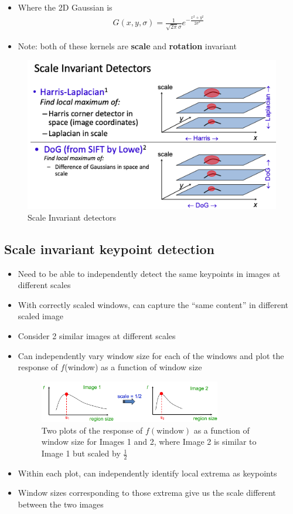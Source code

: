 \documentclass[letterpaper,12pt]{article}
\begin{document}
\begin{itemize}
 \item Where the 2D Gaussian is
       \begin{align}
        G(x, y, \sigma) = \frac{1}{\sqrt{2\pi}\sigma}e^{-\frac{x^2 + y^2}{2\sigma^2}}
       \end{align}
 \item Note: both of these kernels are \textbf{scale} and \textbf{rotation} invariant
\end{itemize}

\begin{figure}
 \includegraphics[scale=0.75]{images/scale_invariant_detectors.png}
 \caption{Scale Invariant detectors}
\end{figure}

\subsection{Scale invariant keypoint detection}
\begin{itemize}
 \item Need to be able to independently detect the same keypoints in images at different scales
 \item With correctly scaled windows, can capture the ``same content'' in different scaled image
 \item Consider 2 similar images at different scales
 \item Can independently vary window size for each of the windows and plot the response of $f$(window) as a function of window size
       \begin{figure}[h]
        \centering
        \includegraphics[width=0.75\textwidth]{images/max.png}
        \caption{Two plots of the response of $f(\text{window})$ as a function of window size for Images 1 and 2, where Image 2 is similar to Image 1 but scaled by $\frac{1}{2}$}
       \end{figure}
 \item Within each plot, can independently identify local extrema as keypoints
 \item Window sizes corresponding to those extrema give us the scale different between the two images
\end{itemize}
\end{document}
